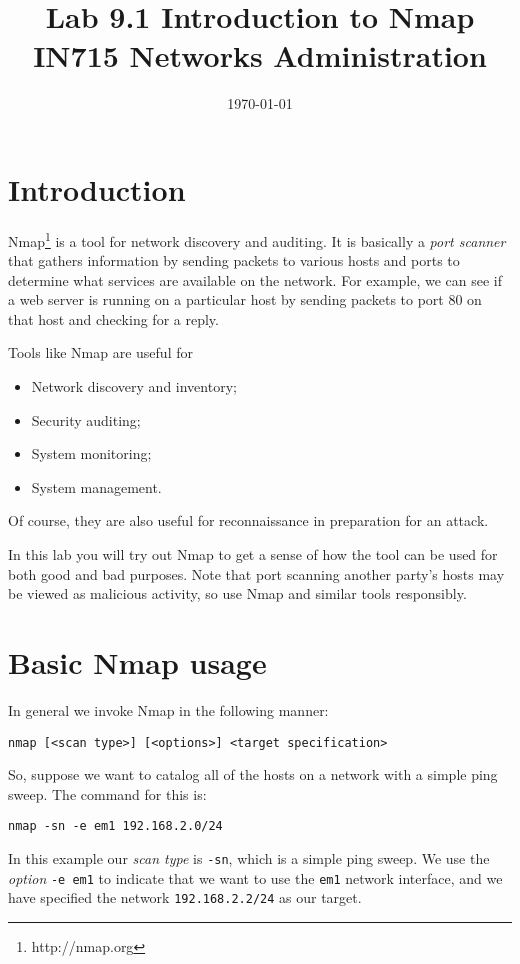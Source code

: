 \documentclass{article}
\begin{document}
\title{ Lab 9.1 Introduction to Nmap\\ IN715 Networks Administration}
\date{\today}
\maketitle

\section*{Introduction}
Nmap\footnote{http://nmap.org} is a tool for network discovery and auditing.  It is basically a \emph{port scanner} that gathers information by sending packets to various hosts and ports to determine what services are available on the network.  For example, we can see if a web server is running on a particular host by sending packets to port 80 on that host and checking for a reply.

Tools like Nmap are useful for 

\begin{itemize}
    \item Network discovery and inventory;
    \item Security auditing;
    \item System monitoring;
    \item System management.
\end{itemize}

Of course, they are also useful for reconnaissance in preparation for an attack.

In this lab you will try out Nmap to get a sense of how the tool can be used for both good and bad purposes. Note that port scanning another party's hosts may be viewed as malicious activity, so use Nmap and similar tools responsibly.



\section{Basic Nmap usage}
In general we invoke Nmap in the following manner:

\texttt{nmap [<scan type>] [<options>] <target specification>}

So, suppose we want to catalog all of the hosts on a network with a simple ping sweep.  The command for this is:

\texttt{nmap -sn -e em1 192.168.2.0/24}

In this example our \emph{scan type} is \texttt{-sn}, which is a simple ping sweep.  We use the \emph{option} \texttt{-e em1} to indicate that we want to use the \texttt{em1} network interface, and we have specified the network \texttt{192.168.2.2/24} as our target.
\end{document}
